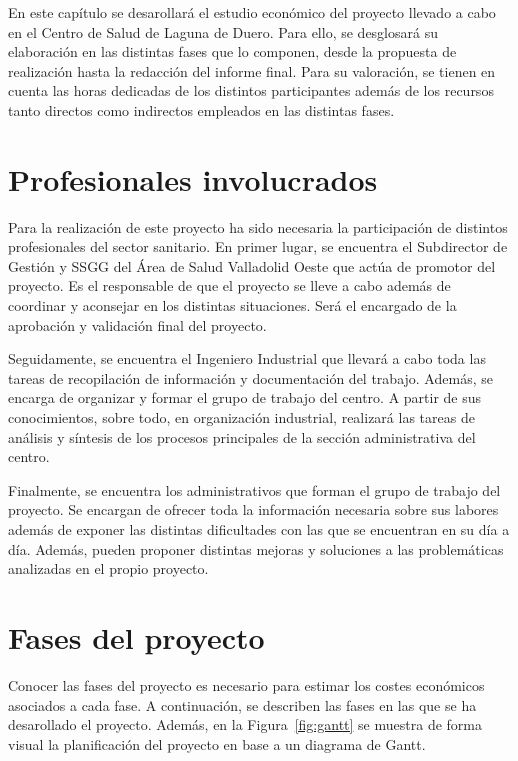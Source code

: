 En este capítulo se desarollará el estudio económico del proyecto llevado a cabo en el Centro de Salud de Laguna de Duero.
Para ello, se desglosará su elaboración en las distintas fases que lo componen, desde la propuesta de realización hasta la redacción del informe final.
Para su valoración, se tienen en cuenta las horas dedicadas de los distintos participantes además de los recursos tanto directos como indirectos empleados en las distintas fases.

\section{Profesionales involucrados}

Para la realización de este proyecto ha sido necesaria la participación de distintos profesionales del sector sanitario.
En primer lugar, se encuentra el Subdirector de Gestión y SSGG del Área de Salud Valladolid Oeste que actúa de promotor del proyecto.
Es el responsable de que el proyecto se lleve a cabo además de coordinar y aconsejar en los distintas situaciones.
Será el encargado de la aprobación y validación final del proyecto.

Seguidamente, se encuentra el Ingeniero Industrial que llevará a cabo toda las tareas de recopilación de información y documentación del trabajo.
Además, se encarga de organizar y formar el grupo de trabajo del centro.
A partir de sus conocimientos, sobre todo, en organización industrial, realizará las tareas de análisis y síntesis de los procesos principales de la sección administrativa del centro.

Finalmente, se encuentra los administrativos que forman el grupo de trabajo del proyecto.
Se encargan de ofrecer toda la información necesaria sobre sus labores además de exponer las distintas dificultades con las que se encuentran en su día a día.
Además, pueden proponer distintas mejoras y soluciones a las problemáticas analizadas en el propio proyecto.

\section{Fases del proyecto}

Conocer las fases del proyecto es necesario para estimar los costes económicos asociados a cada fase.
A continuación, se describen las fases en las que se ha desarollado el proyecto.
Además, en la Figura~\ref{fig:gantt} se muestra de forma visual la planificación del proyecto en base a un diagrama de Gantt.

